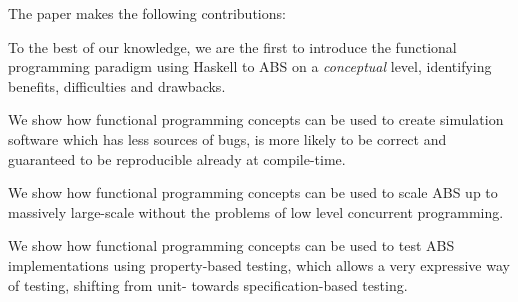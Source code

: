 The paper makes the following contributions:

\begin{itemize*}
	\item To the best of our knowledge, we are the first to introduce the functional programming paradigm using Haskell to ABS on a \textit{conceptual} level, identifying benefits, difficulties and drawbacks.
	\item We show how functional programming concepts can be used to create simulation software which has less sources of bugs, is more likely to be correct and guaranteed to be reproducible already at compile-time.
	\item We show how functional programming concepts can be used to scale ABS up to massively large-scale without the problems of low level concurrent programming.
	\item We show how functional programming concepts can be used to test ABS implementations using property-based testing, which allows a very expressive way of testing, shifting from unit- towards specification-based testing.
\end{itemize*}
